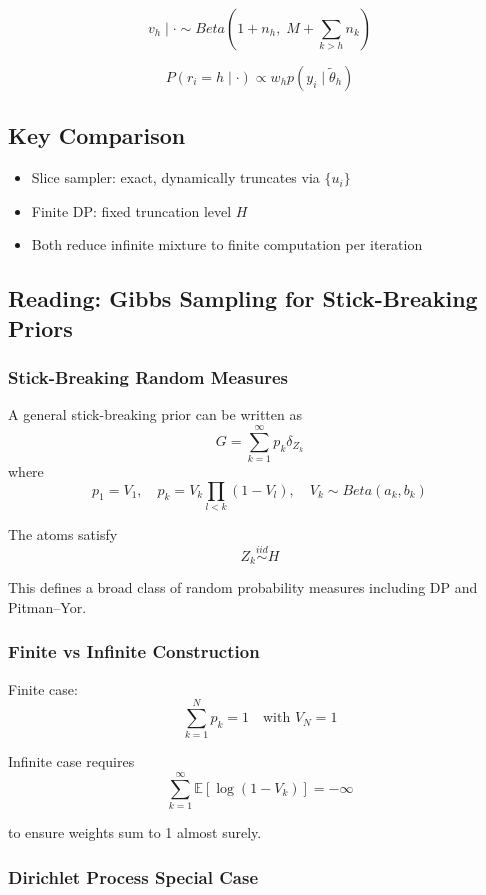 \documentclass[12pt,oneside]{book}
\numberwithin{equation}{section}
\theoremstyle{definition}
\theoremstyle{plain}
\theoremstyle{remark}
\begin{document}
\[
v_h \mid \cdot \sim Beta\left(1 + n_h,\; M + \sum_{k>h} n_k\right)
\]

\[
P(r_i = h \mid \cdot)
\propto
w_h p(y_i \mid \tilde{\theta}_h)
\]

\subsection*{Key Comparison}

\begin{itemize}
\item Slice sampler: exact, dynamically truncates via $\{u_i\}$
\item Finite DP: fixed truncation level $H$
\item Both reduce infinite mixture to finite computation per iteration
\end{itemize}

\subsection{Reading: Gibbs Sampling for Stick-Breaking Priors}

\subsubsection*{Stick-Breaking Random Measures}

A general stick-breaking prior can be written as
\[
G = \sum_{k=1}^{\infty} p_k \delta_{Z_k}
\]
where
\[
p_1 = V_1, \quad p_k = V_k \prod_{l<k}(1 - V_l), \quad V_k \sim Beta(a_k, b_k)
\]

The atoms satisfy
\[
Z_k \overset{iid}{\sim} H
\]

This defines a broad class of random probability measures including DP and Pitman–Yor.

\subsubsection*{Finite vs Infinite Construction}

Finite case:
\[
\sum_{k=1}^N p_k = 1 \quad \text{with } V_N = 1
\]

Infinite case requires
\[
\sum_{k=1}^\infty \mathbb{E}[\log(1 - V_k)] = -\infty
\]

to ensure weights sum to 1 almost surely.

\subsubsection*{Dirichlet Process Special Case}
\end{document}
